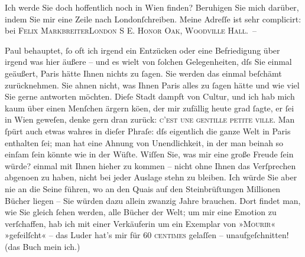\pstart
           Ich werde Sie doch hoffentlich noch in Wien
               finden? Beruhigen {\pb}Sie mich darüber, indem Sie mir
               eine Zeile nach Londonſchreiben. Meine Adreſſe ist sehr complicirt: bei
                  \textsc{Felix MarkbreiterLondon S E. Honor Oak, Woodville Hall}. –\pend
           
\pstart
           Paul behauptet, ſo oft ich irgend ein
               Entzücken oder eine Befriedigung über irgend was hier äußere – und es wi{\geminationm}elt von ſolchen Gelegenheiten, dſs Sie einmal ge{\pb}äußert, Paris
               hätte Ihnen nichts zu ſagen. Sie werden das einmal beſchämt zurücknehmen. Sie ahnen
               nicht, was Ihnen Paris alles zu ſagen hätte und
               wie viel Sie gerne antworten möchten. Dieſe Stadt dampft von Cultur, und ich hab mich
               kaum über einen Menſchen ärgern kö{\geminationn}en, der mir zufällig
               heute grad ſagte, er ſei in Wien geweſen, {\pb}denke gern dran zurück: \textsc{c’est une
                  gentille petite ville}. Man ſpürt auch etwas wahres in dieſer Phraſe: dſs
               eigentlich die ganze Welt in Paris enthalten ſei;
               man hat eine Ahnung von Unendlichkeit, in der man beinah so einſam ſein könnte wie in
               der Wüſte. Wiſſen Sie, was mir eine große Freude ſein würde? einmal mit Ihnen hieher
               zu kommen – nicht {\pb}ohne Ihnen das Verſprechen abgeno{\geminationm}en zu haben, nicht bei jeder Auslage stehn zu bleiben.
               Ich würde Sie aber nie an die Seine führen, wo an den Quais auf den Steinbrüſtungen
               Millionen Bücher liegen – Sie würden dazu allein zwanzig Jahre brauchen. Dort findet
               man, wie Sie gleich ſehen werden, alle Bücher der Welt; {\pb}um mir eine Emotion zu verſchaffen, hab ich mit einer
               Verkäuferin um ein Exemplar von »\textsc{Mourir}« »gefeilſcht« – das Luder hat’s mir für 60 \textsc{centimes}
               gelaſſen – unaufgeſchnitten! (das Buch mein ich.)\pend
           
